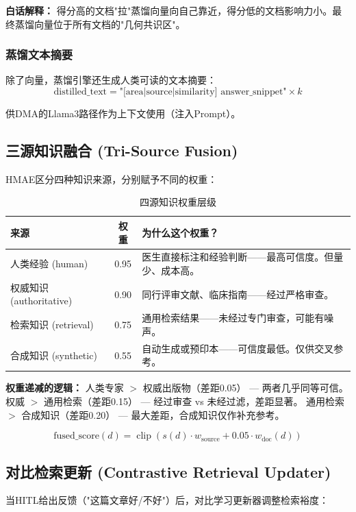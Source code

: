 \documentclass[11pt,a4paper]{ctexart}
\DeclareMathOperator{\clip}{clip}
\begin{document}
\textbf{白话解释：} 得分高的文档"拉"蒸馏向量向自己靠近，得分低的文档影响力小。最终蒸馏向量位于所有文档的"几何共识区"。

\subsubsection{蒸馏文本摘要}

除了向量，蒸馏引擎还生成人类可读的文本摘要：
$$\text{distilled\_text} = \text{"[area|source|similarity] answer\_snippet"} \times k$$

供DMA的Llama3路径作为上下文使用（注入Prompt）。

\subsection{三源知识融合 (Tri-Source Fusion)}

HMAE区分四种知识来源，分别赋予不同的权重：

\begin{table}[H]
\centering
\begin{tabular}{lcp{8cm}}
\toprule
\textbf{来源} & \textbf{权重} & \textbf{为什么这个权重？} \\
\midrule
人类经验 (human) & 0.95 & 医生直接标注和经验判断——最高可信度。但量少、成本高。\\
权威知识 (authoritative) & 0.90 & 同行评审文献、临床指南——经过严格审查。\\
检索知识 (retrieval) & 0.75 & 通用检索结果——未经过专门审查，可能有噪声。\\
合成知识 (synthetic) & 0.55 & 自动生成或预印本——可信度最低。仅供交叉参考。\\
\bottomrule
\end{tabular}
\caption{四源知识权重层级}
\end{table}

\textbf{权重递减的逻辑：} 人类专家 $>$ 权威出版物（差距0.05） — 两者几乎同等可信。
权威 $>$ 通用检索（差距0.15） — 经过审查 vs 未经过滤，差距显著。
通用检索 $>$ 合成知识（差距0.20） — 最大差距，合成知识仅作补充参考。

$$\text{fused\_score}(d) = \clip\left(s(d) \cdot w_{\text{source}} + 0.05 \cdot w_{\text{doc}}(d)\right)$$

\subsection{对比检索更新 (Contrastive Retrieval Updater)}

当HITL给出反馈（"这篇文章好/不好"）后，对比学习更新器调整检索裕度：
\end{document}
